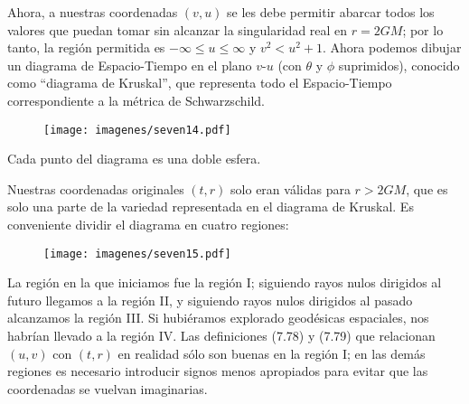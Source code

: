 \documentclass[11pt,b5paper,openany,twoside]{book}
\begin{document}
Ahora, a nuestras coordenadas $(v,u)$ se les debe permitir abarcar todos los valores que puedan tomar sin alcanzar la singularidad real en $r=2GM$; por lo tanto, la región permitida es $-\infty \leq u \leq \infty$ y $v^2 < u^2+1$.
Ahora podemos dibujar un diagrama de Espacio-Tiempo en el plano $v$-$u$ (con $\theta$ y $\phi$ suprimidos), conocido como ``diagrama de Kruskal'', que representa todo el Espacio-Tiempo correspondiente a la métrica de Schwarzschild.

\begin{figure}[h]
\centering
\texttt{[image: imagenes/seven14.pdf]}
\end{figure}

\noindent
Cada punto del diagrama es una doble esfera.

Nuestras coordenadas originales $(t,r)$ solo eran válidas para $r>2GM$, que es solo una parte de la variedad representada en el diagrama de Kruskal.
Es conveniente dividir el diagrama en cuatro regiones:

\begin{figure}[h]
\centering
\texttt{[image: imagenes/seven15.pdf]}
\end{figure}

\noindent
La región en la que iniciamos fue la región I; siguiendo rayos nulos dirigidos al futuro llegamos a la región II, y siguiendo rayos nulos dirigidos al pasado alcanzamos la región III.
Si hubiéramos explorado geodésicas espaciales, nos habrían llevado a la región IV.
Las definiciones (7.78) y (7.79) que relacionan $(u,v)$ con $(t,r)$ en realidad sólo son buenas en la región I; en las demás regiones es necesario introducir signos menos apropiados para evitar que las coordenadas se vuelvan imaginarias.
\end{document}
